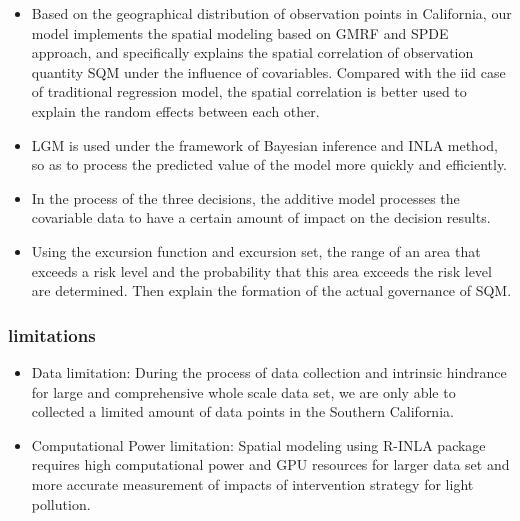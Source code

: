 \documentclass{mcmthesis}
\begin{document}
\begin{itemize}
	
\item Based on the geographical distribution of observation points in California, our model implements the spatial modeling based on GMRF and SPDE approach, and specifically explains the spatial correlation of observation quantity SQM under the influence of covariables. Compared with the iid case of traditional regression model, the spatial correlation is better used to explain the random effects between each other.  

\item LGM is used under the framework of Bayesian inference and INLA method, so as to process the predicted value of the model more quickly and efficiently.

\item In the process of the three decisions, the additive model processes the covariable data to have a certain amount of impact on the decision results.

\item Using the excursion function and excursion set, the range of an area that exceeds a risk level and the probability that this area exceeds the risk level are determined. Then explain the formation of the actual governance of SQM.

\end{itemize}

\subsubsection{limitations}
\begin{itemize}
\item Data limitation: During the process of data collection and intrinsic hindrance for large and comprehensive whole scale data set, we are only able to collected a limited amount of data points in the Southern California.
\item Computational Power limitation: Spatial modeling using R-INLA package requires high computational power and GPU resources for larger data set and more accurate measurement of impacts of intervention strategy for light pollution.

\end{itemize}
\end{document}
